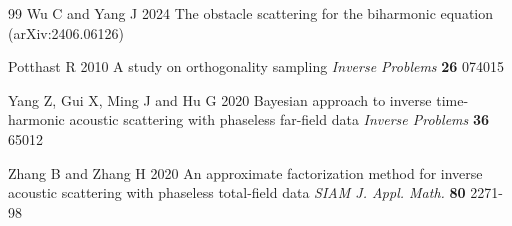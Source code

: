 \documentclass[10pt,a4paper]{article}
\numberwithin{equation}{section}
\begin{document}
\begin{thebibliography}{99}
  Wu C and Yang J 2024 The obstacle scattering for the biharmonic equation (arXiv:2406.06126)
  
  Potthast R 2010 A study on orthogonality sampling \emph{Inverse Problems} {\bf 26} 074015

   Yang Z, Gui X, Ming J and Hu G 2020 Bayesian approach to inverse time-harmonic acoustic scattering with phaseless far-field data \emph{Inverse Problems} {\bf 36} 65012

     Zhang B and Zhang H 2020 An approximate factorization method for inverse acoustic scattering with phaseless total-field data \emph{SIAM J. Appl. Math.} {\bf 80} 2271-98

 \end{thebibliography}
\end{document}
